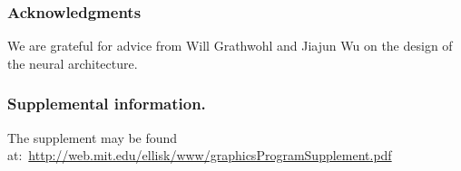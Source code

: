 \documentclass{article}
\begin{document}
\subsubsection*{Acknowledgments} We are grateful for advice from Will Grathwohl and Jiajun Wu on the design of the neural architecture.

\subsubsection*{Supplemental information.} The supplement may be found at:~\url{http://web.mit.edu/ellisk/www/graphicsProgramSupplement.pdf}


%



                  {\small }
\end{document}
